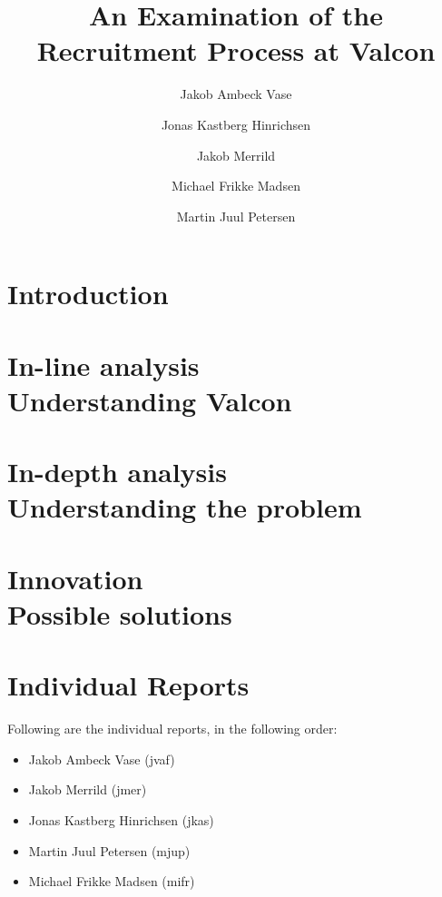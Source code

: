 \documentclass[hidelinks, a4paper]{report}
\begin{document}


\title{An Examination of the Recruitment Process at Valcon}
\author{Jakob Ambeck Vase \and Jonas Kastberg Hinrichsen \and Jakob Merrild \and Michael Frikke Madsen \and Martin Juul Petersen}

\maketitle
{}
\tableofcontents
\newpage
{}
\chapter{Introduction}

\newpage
\chapter{In-line analysis \\ Understanding Valcon}

\chapter{In-depth analysis \\ Understanding the problem}

\chapter{Innovation \\ Possible solutions}


\appendix


\chapter{Individual Reports}
Following are the individual reports, in the following order:
\begin{itemize}

\item Jakob Ambeck Vase (jvaf)
\item Jakob Merrild (jmer)
\item Jonas Kastberg Hinrichsen (jkas)
\item Martin Juul Petersen (mjup)
\item Michael Frikke Madsen (mifr)

\end{itemize}






\end{document}
